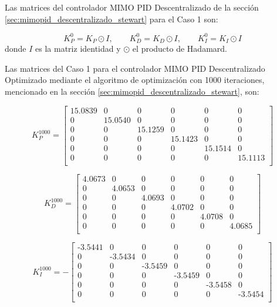 Las matrices del controlador MIMO PID Descentralizado de la sección \ref{sec:mimopid_descentralizado_stewart} para el Caso 1 son:

\begin{equation}
    K_P^0 = K_P \odot I, \qquad K_D^0 = K_D \odot I, \qquad K_I^0 = K_I \odot I
\end{equation}
donde $I$ es la matriz identidad y $\odot$ el producto de Hadamard.

Las matrices del Caso 1 para el controlador MIMO PID Descentralizado Optimizado mediante el algoritmo de optimización con 1000 iteraciones, mencionado en la sección \ref{sec:mimopid_descentralizado_stewart}, son:

\begin{equation}
    K_P^{1000} = \begin{bmatrix}
        15.0839 &	0 &	0 &	0 &	0 &	0 \\
        0 &	15.0540 &	0 &	0 &	0 &	0 \\
        0 &	0 &	15.1259 &	0 &	0 &	0 \\
        0 &	0 &	0 &	15.1423 &	0 &	0 \\
        0 &	0 &	0 &	0 &	15.1514 &	0 \\
        0 &	0 &	0 &	0 &	0 &	15.1113 \\
    \end{bmatrix}
\end{equation}

\begin{equation}
    K_D^{1000} = \begin{bmatrix}
        4.0673 &	0 &	0 &	0 &	0 &	0 \\
        0 &	4.0653 &	0 &	0 &	0 &	0 \\
        0 &	0 &	4.0693 &	0 &	0 &	0 \\
        0 &	0 &	0 &	4.0702 &	0 &	0 \\
        0 &	0 &	0 &	0 &	4.0708 &	0 \\
        0 &	0 &	0 &	0 &	0 &	4.0685 \\
    \end{bmatrix}
\end{equation}

\begin{equation}
    K_I^{1000} = -\begin{bmatrix}
    \textrm{-}3.5441 &	0 &	0 &	0 &	0 &	0 \\
    0 &	\textrm{-}3.5434 &	0 &	0 &	0 &	0 \\
    0 &	0 &	\textrm{-}3.5459 &	0 &	0 &	0 \\
    0 &	0 &	0 &	\textrm{-}3.5459 &	0 &	0 \\
    0 &	0 &	0 &	0 &	\textrm{-}3.5458 &	0 \\
    0 &	0 &	0 &	0 &	0 &	\textrm{-}3.5454 \\
    \end{bmatrix}
\end{equation}

